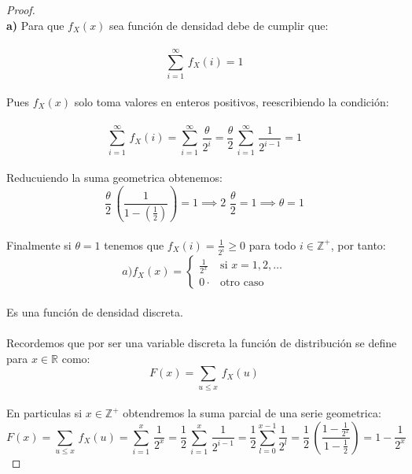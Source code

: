 \documentclass[11pt,letterpaper]{article}
\newcommand{\R}{\mathbb{R}}
\newcommand{\Z}{\mathbb{Z}}
\begin{document}
\begin{proof}\,\\
  \textbf{a)}\,\,Para que $f_X(x)$ sea funci\'on de densidad debe de cumplir que:\,\\
  \,\\
  \begin{equation*}
    \sum_{i=1}^{\infty}\,f_X(i)=1
  \end{equation*}\,\\
  Pues $f_X(x)$ solo toma valores en enteros positivos, reescribiendo la condici\'on:\,\\
  \,\\
  \begin{equation*}
    \sum_{i=1}^{\infty}\,f_X(i)=\sum_{i=1}^{\infty}\,\frac{\theta}{2^i}=\frac{\theta}{2}\,\sum_{i=1}^{\infty}\,\frac{1}{2^{i-1}}=1
  \end{equation*}\,\\
  Reducuiendo la suma geometrica obtenemos:\,\\
  \begin{equation*}
    \frac{\theta}{2}\,\left(\frac{1}{1-\left(\frac{1}{2}\right)}\right)=1\implies 2\,\,\frac{\theta}{2}=1\implies \theta=1
  \end{equation*}\,\\
  Finalmente si $\theta=1$ tenemos que $f_X(i)=\frac{1}{2^i}\geq 0$ para todo $i\in \Z^{+}$, por tanto:\,\\
  \begin{equation*}
    a)f_X(x)=\begin{cases} 
      \frac{1}{2^x}              & \mbox{si } x=1,2,\dots   \\
      0 \cdot                         & \text{otro caso}
   \end{cases}
\end{equation*}\,\\
Es una funci\'on de densidad discreta.\,\\
\,\\
Recordemos que por ser una variable discreta la funci\'on de distribuci\'on se define para $x\in \R$ como:\,\\
\begin{equation*}
  F(x)=\sum_{u\leq x}\,f_X(u)
\end{equation*}\,\\
En particulas si $x\in \Z^{+}$ obtendremos la suma parcial de una serie geometrica:\,\\
\begin{equation*}
  F(x)=\sum_{u\leq x}\,f_X(u)=\sum_{i=1}^{x}\,\frac{1}{2^x}=\frac{1}{2}\,\sum_{i=1}^{x}\,\frac{1}{2^{i-1}}=\frac{1}{2}\sum_{l=0}^{x-1}\frac{1}{2^l}=\frac{1}{2}\,\left(\frac{1-\frac{1}{2^x}}{1-\frac{1}{2}}\right)=1-\frac{1}{2^x}

\end{equation*}
\end{proof}
\end{document}
